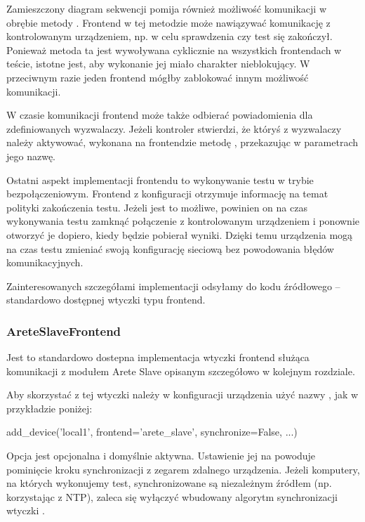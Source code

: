 \documentclass[00-praca-magisterska.tex]{subfiles}
\begin{document}
Zamieszczony diagram sekwencji pomija również możliwość komunikacji w obrębie
metody . Frontend w tej metodzie może nawiązywać
komunikację z kontrolowanym urządzeniem, np. w celu sprawdzenia czy test się
zakończył. Ponieważ metoda ta jest wywoływana cyklicznie na wszystkich
frontendach w teście, istotne jest, aby wykonanie jej miało charakter
nieblokujący. W przeciwnym razie jeden frontend mógłby zablokować innym
możliwość komunikacji.

W czasie komunikacji frontend może także odbierać powiadomienia dla
zdefiniowanych wyzwalaczy. Jeżeli kontroler stwierdzi, że któryś z wyzwalaczy
należy aktywować, wykonana na frontendzie metodę , przekazując w
parametrach jego nazwę.

Ostatni aspekt implementacji frontendu to wykonywanie testu w trybie
bezpołączeniowym. Frontend z konfiguracji otrzymuje informację na temat
polityki zakończenia testu. Jeżeli jest to możliwe, powinien on na czas
wykonywania testu zamknąć połączenie z kontrolowanym urządzeniem i ponownie
otworzyć je dopiero, kiedy będzie pobierał wyniki. Dzięki temu urządzenia mogą
na czas testu zmieniać swoją konfigurację sieciową bez powodowania błędów
komunikacyjnych.

Zainteresowanych szczegółami implementacji odsyłamy do kodu źródłowego
 -- standardowo dostępnej wtyczki typu frontend.

\subsubsection{AreteSlaveFrontend}

Jest to standardowo dostepna implementacja wtyczki frontend służąca komunikacji
z modułem Arete Slave opisanym szczegółowo w kolejnym rozdziale.

Aby skorzystać z tej wtyczki należy w konfiguracji urządzenia użyć nazwy
, jak w przykładzie poniżej:

\begin{pythoncode}
  add_device('local1',
    frontend='arete_slave',
    synchronize=False,
    ...)
\end{pythoncode}

Opcja  jest opcjonalna i domyślnie aktywna. Ustawienie jej na
 powoduje pominięcie kroku synchronizacji z zegarem zdalnego
urządzenia. Jeżeli komputery, na których wykonujemy test, synchronizowane są
niezależnym źródłem (np. korzystając z NTP), zaleca się wyłączyć wbudowany
algorytm synchronizacji wtyczki .
\end{document}
